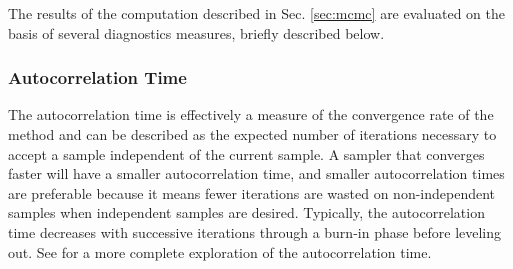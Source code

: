 \documentclass[preprint]{aastex}
\begin{document}
The results of the computation described in Sec. \ref{sec:mcmc} are evaluated 
on the basis of several diagnostics measures, briefly described below.

\subsubsection{Autocorrelation Time}
\label{sec:acorr}

The autocorrelation time is effectively a measure of the convergence rate of 
the method and can be described as the expected number of iterations necessary 
to accept a sample independent of the current sample.  A sampler that converges 
faster will have a smaller autocorrelation time, and smaller autocorrelation 
times are preferable because it means fewer iterations are wasted on 
non-independent samples when independent samples are desired.  Typically, the 
autocorrelation time decreases with successive iterations through a burn-in 
phase before leveling out.  See \citet{Foreman-Mackey2013} for a more complete 
exploration of the autocorrelation time.
\end{document}
